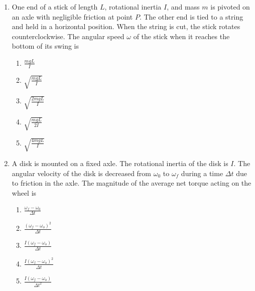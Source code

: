 \documentclass{../../../oss-classkick}
\begin{document}
\begin{multicols}{2}
\begin{enumerate}[leftmargin=18pt]
  \item One end of a stick of length $L$, rotational inertia $I$, and mass $m$
    is pivoted on an axle with negligible friction at point $P$. The other end
    is tied to a string and held in a horizontal position. When the string is
    cut, the stick rotates counterclockwise. The angular speed $\omega$ of the
    stick when it reaches the bottom of its swing is
    \begin{enumerate}[nosep,leftmargin=18pt,label=(\Alph*)]
    \item$\displaystyle\frac{mgL}{I}$
    \item$\displaystyle\sqrt{\frac{mgL}{I}}$
    \item$\displaystyle\sqrt{\frac{2mgL}{I}}$
    \item$\displaystyle\sqrt{\frac{mgL}{2I}}$
    \item$\displaystyle\sqrt{\frac{4mgL}{I}}$
    \end{enumerate}
    \columnbreak
    
  \item A disk is mounted on a fixed axle. The rotational inertia of the disk is
    $I$. The angular velocity of the disk is decreased from $\omega_0$ to
    $\omega_f$ during a time $\Delta t$ due to friction in the axle. The
    magnitude of the average net torque acting on the wheel is
    \begin{enumerate}[noitemsep,topsep=0pt,leftmargin=18pt,label=(\Alph*)]
    \item $\displaystyle\frac{\omega_f-\omega_0}{\Delta t}$
    \item $\displaystyle\frac{(\omega_f-\omega_o)^2}{\Delta t}$
    \item $\displaystyle\frac{I(\omega_f-\omega_o)}{\Delta t}$
    \item $\displaystyle\frac{I(\omega_f-\omega_o)^2}{\Delta t}$
    \item $\displaystyle\frac{I(\omega_f-\omega_o)}{\Delta t^2}$
    \end{enumerate}
    

\end{enumerate}
\end{multicols}
\end{document}
